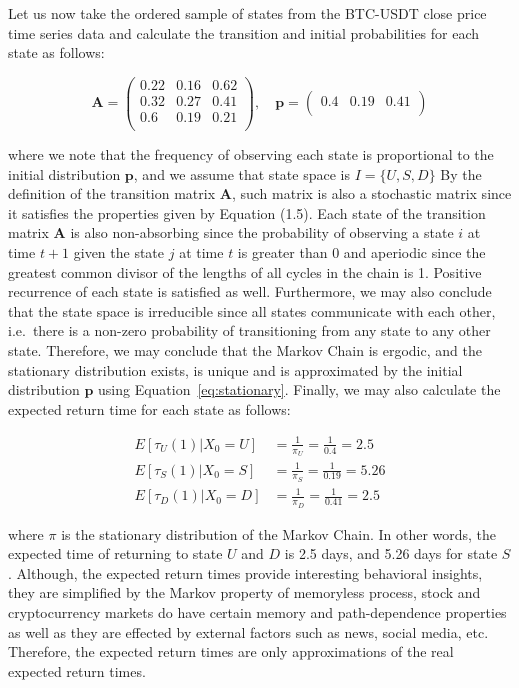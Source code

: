 Let us now take the ordered sample of states from the BTC-USDT close price time series data and calculate 
the transition and initial probabilities for each state as follows:

\begin{equation}
    \textbf{A} = \begin{pmatrix}
     0.22 & 0.16 & 0.62 \\
     0.32 & 0.27 & 0.41 \\
     0.6 & 0.19 & 0.21 \\
     \end{pmatrix}
     , \quad 
     \textbf{p} = \begin{pmatrix}
     0.4 & 0.19 & 0.41 \\
     \end{pmatrix}
 \end{equation}

where we note that the frequency of observing each state is proportional to the initial distribution $\textbf{p}$, and we assume that state space is $I = \{U,S,D\}$ 
By the definition of the transition matrix $\textbf{A}$, such matrix is also a stochastic matrix since it satisfies the properties given by Equation (1.5).
Each state of the transition matrix $\textbf{A}$ is also non-absorbing since the probability of observing a state $i$ at time $t+1$ given the state $j$ at time $t$ is greater than 0 
and aperiodic since the greatest common divisor of the lengths of all cycles in the chain is 1. Positive recurrence of each state is satisfied as well.
Furthermore, we may also conclude that the state space is irreducible since all states communicate with each other, i.e.\ there is a non-zero probability of transitioning from any state to any other state.
Therefore, we may conclude that the Markov Chain is ergodic, and the stationary distribution exists, is unique and is approximated by the initial distribution $\textbf{p}$ using Equation~\ref{eq:stationary}.
Finally, we may also calculate the expected return time for each state as follows:

\begin{align}
    E[\tau_U(1)|X_0=U] &= \frac{1}{\pi_U} = \frac{1}{0.4} = 2.5 \\
    E[\tau_S(1)|X_0=S] &= \frac{1}{\pi_S} = \frac{1}{0.19} = 5.26 \\
    E[\tau_D(1)|X_0=D] &= \frac{1}{\pi_D} = \frac{1}{0.41} = 2.5
\end{align}

where $\pi$ is the stationary distribution of the Markov Chain. In other words, the expected time of returning to 
state $U$ and $D$ is 2.5 days, and 5.26 days for state $S$. Although, the expected return times provide interesting behavioral insights,
they are simplified by the Markov property of memoryless process, stock and cryptocurrency markets do have certain memory and path-dependence properties as well as they 
are effected by external factors such as news, social media, etc. Therefore, the expected return times are only approximations of the real expected return times.


